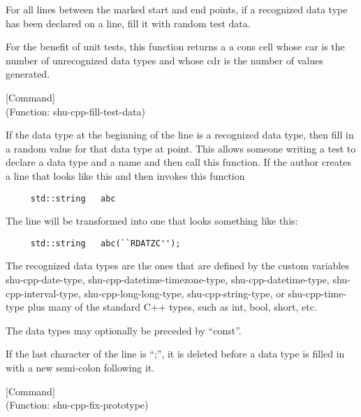 \begin{doc-string}
For all lines between the marked start and end points, if a recognized data
type has been declared on a line, fill it with random test data.

For the benefit of unit tests, this function returns a a cons cell whose car is
the number of unrecognized data types and whose cdr is the number of values
generated.
\end{doc-string}

\vspace{1em}
\noindent
{}
\usebox{\funcname}
 \hfill [Command]\\%
 (Function: shu-cpp-fill-test-data)

\begin{doc-string}
If the data type at the beginning of the line is a recognized data type, then
fill in a random value for that data type at point.  This allows someone writing
a test to declare a data type and a name and then call this function.  If the
author creates a line that looks like this and then invokes this function

\small{\begin{verbatim}
     std::string   abc
\end{verbatim}}

The line will be transformed into one that looks something like this:

\small{\begin{verbatim}
     std::string   abc(``RDATZC'');
\end{verbatim}}

The recognized data types are the ones that are defined by the custom variables
shu-cpp-date-type, shu-cpp-datetime-timezone-type, shu-cpp-datetime-type,
shu-cpp-interval-type, shu-cpp-long-long-type, shu-cpp-string-type, or
shu-cpp-time-type plus many of the standard C++ types, such as int, bool, short,
etc.

The data types may optionally be preceded by ``const''.

If the last character of the line is ``;'', it is deleted before a data type is
filled in with a new semi-colon following it.
\end{doc-string}

\vspace{1em}
\noindent
{}
\usebox{\funcname}
 \hfill [Command]\\%
 (Function: shu-cpp-fix-prototype)

